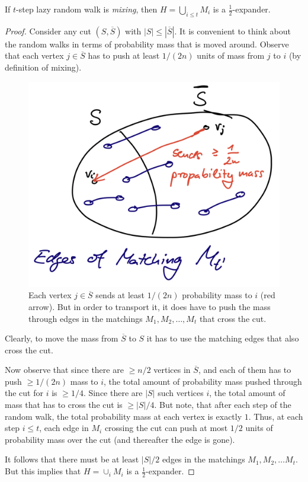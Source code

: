 \begin{lemma}
If $t$-step lazy random walk is \emph{mixing}, then $H = \bigcup_{i \leq t} M_i$ is a $\frac{1}{2}$-expander.
\end{lemma}
\begin{proof}
Consider any cut $(S, \overline{S})$ with $|S| \leq |\overline{S}|$. It is convenient to think about the random walks in terms of probability mass that is moved around. Observe that each vertex $j \in \overline{S}$ has to push at least $1/(2n)$ units of mass from $j$ to $i$ (by definition of mixing). 

\begin{figure}[!ht]
    \centering
    \includegraphics[scale=0.15]{./fig/MixingWalkIsExpander_lectureCutMatching.jpeg}
    \caption{Each vertex $j \in \overline{S}$ sends at least $1/(2n)$ probability mass to $i$ (red arrow). But in order to transport it, it does have to push the mass through edges in the matchings $M_1, M_2, \dots, M_t$ that cross the cut.}
\end{figure}

Clearly, to move the mass from $\overline{S}$ to $S$ it has to use the matching edges that also cross the cut.

Now observe that since there are $\geq n/2$ vertices in $\overline{S}$, and each of them has to push $\geq 1/(2n)$ mass to $i$, the total amount of probability mass pushed through the cut for $i$ is $\geq 1/4$. Since there are $|S|$ such vertices $i$, the total amount of mass that has to cross the cut is $\geq |S|/4$. 
But note, that after each step of the random walk, the total probability mass at each vertex is exactly $1$. Thus, at each step $i \leq t$, each edge in $M_{i}$ crossing the cut can push at most $1/2$ units of probability mass over the cut (and thereafter the edge is gone). 

It follows that there must be at least $|S|/2$ edges in the matchings $M_1, M_2, \dots M_{t}$. But this implies that $H = \cup_i M_i$ is a $\frac{1}{2}$-expander.
\end{proof}


